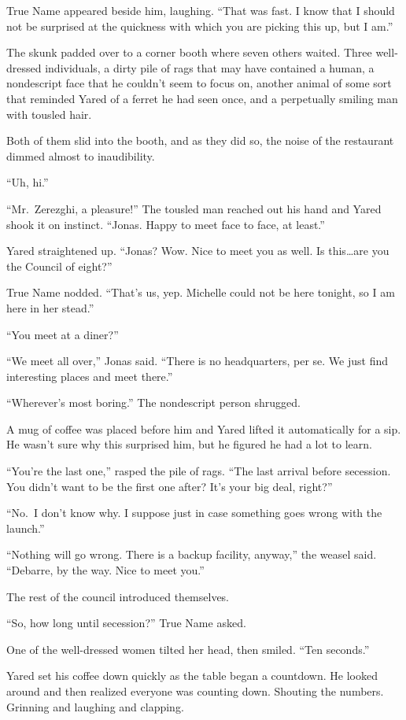 True Name appeared beside him, laughing. ``That was fast. I know that I should not be surprised at the quickness with which you are picking this up, but I am.''

The skunk padded over to a corner booth where seven others waited. Three well-dressed individuals, a dirty pile of rags that may have contained a human, a nondescript face that he couldn't seem to focus on, another animal of some sort that reminded Yared of a ferret he had seen once, and a perpetually smiling man with tousled hair.

Both of them slid into the booth, and as they did so, the noise of the restaurant dimmed almost to inaudibility.

``Uh, hi.''

``Mr.~Zerezghi, a pleasure!'' The tousled man reached out his hand and Yared shook it on instinct. ``Jonas. Happy to meet face to face, at least.''

Yared straightened up. ``Jonas? Wow. Nice to meet you as well. Is this\ldots are you the Council of eight?''

True Name nodded. ``That's us, yep. Michelle could not be here tonight, so I am here in her stead.''

``You meet at a diner?''

``We meet all over,'' Jonas said. ``There is no headquarters, per se. We just find interesting places and meet there.''

``Wherever's most boring.'' The nondescript person shrugged.

A mug of coffee was placed before him and Yared lifted it automatically for a sip. He wasn't sure why this surprised him, but he figured he had a lot to learn.

``You're the last one,'' rasped the pile of rags. ``The last arrival before secession. You didn't want to be the first one after? It's your big deal, right?''

``No.~I don't know why. I suppose just in case something goes wrong with the launch.''

``Nothing will go wrong. There is a backup facility, anyway,'' the weasel said. ``Debarre, by the way. Nice to meet you.''

The rest of the council introduced themselves.

``So, how long until secession?'' True Name asked.

One of the well-dressed women tilted her head, then smiled. ``Ten seconds.''

Yared set his coffee down quickly as the table began a countdown. He looked around and then realized everyone was counting down. Shouting the numbers. Grinning and laughing and clapping.

